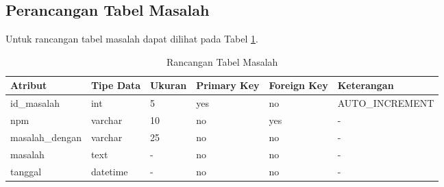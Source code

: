\subsection{Perancangan Tabel Masalah}
Untuk rancangan tabel masalah dapat dilihat pada Tabel
\ref{tab:rancangantabelmasalah}.

\begin{table}[ht]
\caption[Tabel Rancangan Tabel Masalah]{Rancangan Tabel Masalah}
\label{tab:rancangantabelmasalah}
\centering
\begin{tabular}{|l|l|p{1.2cm}|p{1.2cm}|p{1.2cm}|l|}
\hline
Atribut & Tipe Data & Ukuran & Primary Key & Foreign Key & Keterangan\\
\hline
id\_masalah & int & 5 & yes & no & AUTO\_INCREMENT\\
\hline
npm & varchar & 10 & no & yes & -\\
\hline
masalah\_dengan & varchar & 25 & no & no & -\\
\hline
masalah & text & - & no & no & -\\
\hline
tanggal & datetime & - & no & no & -\\
\hline
\end{tabular}
\end{table}






